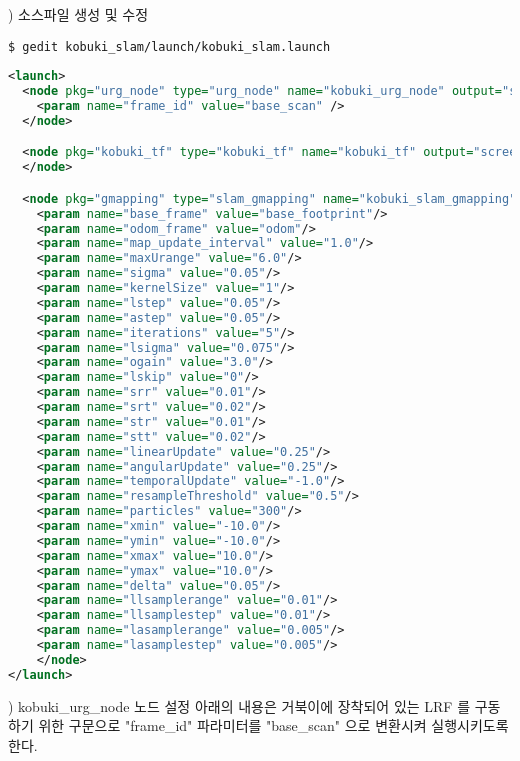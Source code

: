 \vspace{\baselineskip}
\noindent
{}
\thenum) 소스파일 생성 및 수정

\vspace{\baselineskip}
\begin{lstlisting}[language=ROS]
$ gedit kobuki_slam/launch/kobuki_slam.launch
\end{lstlisting}


\vspace{\baselineskip}
\begin{lstlisting}[language=XML]
<launch>
  <node pkg="urg_node" type="urg_node" name="kobuki_urg_node" output="screen">
    <param name="frame_id" value="base_scan" />
  </node>

  <node pkg="kobuki_tf" type="kobuki_tf" name="kobuki_tf" output="screen">
  </node>

  <node pkg="gmapping" type="slam_gmapping" name="kobuki_slam_gmapping" output="screen">
    <param name="base_frame" value="base_footprint"/>
    <param name="odom_frame" value="odom"/>
    <param name="map_update_interval" value="1.0"/>
    <param name="maxUrange" value="6.0"/>
    <param name="sigma" value="0.05"/>
    <param name="kernelSize" value="1"/>
    <param name="lstep" value="0.05"/>
    <param name="astep" value="0.05"/>
    <param name="iterations" value="5"/>
    <param name="lsigma" value="0.075"/>
    <param name="ogain" value="3.0"/>
    <param name="lskip" value="0"/>
    <param name="srr" value="0.01"/>
    <param name="srt" value="0.02"/>
    <param name="str" value="0.01"/>
    <param name="stt" value="0.02"/>
    <param name="linearUpdate" value="0.25"/>
    <param name="angularUpdate" value="0.25"/>
    <param name="temporalUpdate" value="-1.0"/>
    <param name="resampleThreshold" value="0.5"/>
    <param name="particles" value="300"/>
    <param name="xmin" value="-10.0"/>
    <param name="ymin" value="-10.0"/>
    <param name="xmax" value="10.0"/>
    <param name="ymax" value="10.0"/>
    <param name="delta" value="0.05"/>
    <param name="llsamplerange" value="0.01"/>
    <param name="llsamplestep" value="0.01"/>
    <param name="lasamplerange" value="0.005"/>
    <param name="lasamplestep" value="0.005"/>
    </node>
</launch>
\end{lstlisting}



\vspace{\baselineskip}
\noindent
{}) kobuki\_urg\_node 노드 설정
아래의 내용은 거북이에 장착되어 있는 LRF 를 구동하기 위한 구문으로 "frame\_id" 파라미터를 "base\_scan" 으로 변환시켜 실행시키도록 한다.

